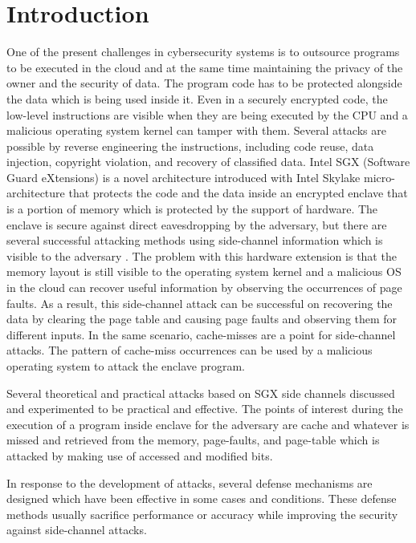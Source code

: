 \section{Introduction}

One of the present challenges in cybersecurity systems is to outsource programs to be executed in the cloud and at the same time maintaining the privacy of the owner and the security of data. The program code has to be protected alongside the data which is being used inside it. Even in a securely encrypted code, the low-level instructions are visible when they are being executed by the CPU and a malicious operating system kernel can tamper with them. Several attacks are possible by reverse engineering the instructions, including code reuse, data injection, copyright violation, and recovery of classified data. Intel SGX (Software Guard eXtensions) \cite{sgx} is a novel architecture introduced with Intel Skylake micro-architecture \cite{skylake} that protects the code and the data inside an encrypted enclave that is a portion of memory which is protected by the support of hardware. The enclave is secure against direct eavesdropping by the adversary, but there are several successful attacking methods using side-channel information which is visible to the adversary \cite{leakycauldron}. The problem with this hardware extension is that the memory layout is still visible to the operating system kernel and a malicious OS in the cloud can recover useful information by observing the occurrences of page faults. As a result, this side-channel attack can be successful on recovering the data by clearing the page table and causing page faults and observing them for different inputs. In the same scenario, cache-misses are a point for side-channel attacks. The pattern of cache-miss occurrences can be used by a malicious operating system to attack the enclave program.

Several theoretical and practical attacks based on SGX side channels discussed and experimented to be practical and effective. The points of interest during the execution of a program inside enclave for the adversary are cache and whatever is missed and retrieved from the memory, page-faults, and page-table which is attacked by making use of accessed and modified bits.

In response to the development of attacks, several defense mechanisms are designed which have been effective in some cases and conditions. These defense methods usually sacrifice performance or accuracy while improving the security against side-channel attacks. 

